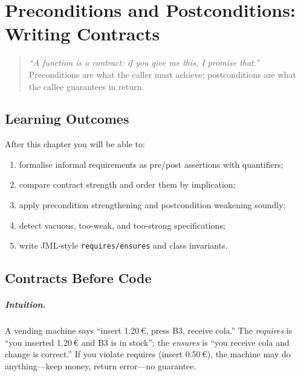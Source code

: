 \chapter{Preconditions and Postconditions: Writing Contracts}
\label{ch:prepost}

\begin{quote}
\emph{``A function is a contract: if you give me this, I promise that.''} Preconditions are what the caller must achieve; postconditions are what the callee guarantees in return.
\end{quote}

\noindent{}
\vspace{0.4em}

\section*{Learning Outcomes}
After this chapter you will be able to:
\begin{enumerate}[label=(L\arabic*)]
    \item formalise informal requirements as pre/post assertions with quantifiers;
    \item compare contract strength and order them by implication;
    \item apply precondition strengthening and postcondition weakening soundly;
    \item detect vacuous, too-weak, and too-strong specifications;
    \item write JML-style \texttt{requires/ensures} and class invariants.
\end{enumerate}

\section{Contracts Before Code}
\label{sec:contracts}
\paragraph{Intuition.} A vending machine says ``insert 1.20\,€, press B3, receive cola.'' The \emph{requires} is ``you inserted 1.20\,€ and B3 is in stock''; the \emph{ensures} is ``you receive cola and change is correct.'' If you violate requires (insert 0.50\,€), the machine may do anything—keep money, return error—no guarantee.


